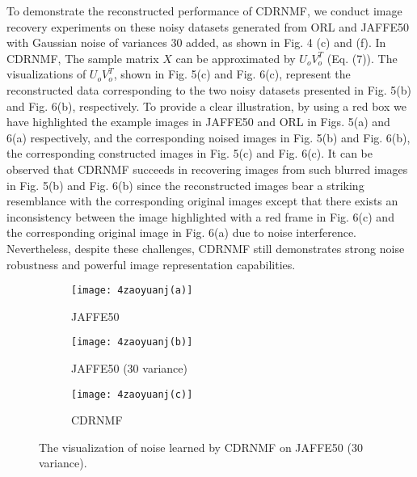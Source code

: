 \documentclass[a4paper,fleqn]{cas-sc}
\begin{document}
To demonstrate the reconstructed performance of CDRNMF, we conduct image recovery experiments on these noisy datasets generated from ORL and JAFFE50 with Gaussian noise of variances 30 added, as shown in Fig. 4 (c) and (f). In CDRNMF, The sample matrix $X$ can be approximated by $U_o V_o^T$ (Eq. (7)). The visualizations of $U_o V_o^T$, shown in Fig. 5(c) and Fig. 6(c), represent the reconstructed data corresponding to the two noisy datasets presented in Fig. 5(b) and Fig. 6(b), respectively. To provide a clear illustration, by using a red box we have highlighted the example images in JAFFE50 and ORL in Figs. 5(a) and 6(a) respectively, and the corresponding noised images in Fig. 5(b) and Fig. 6(b), the corresponding constructed images in Fig. 5(c) and Fig. 6(c). It can be observed that CDRNMF succeeds in recovering images from such blurred images in Fig. 5(b) and Fig. 6(b) since the reconstructed images bear a striking resemblance with the corresponding original images except that there exists an inconsistency between the image highlighted with a red frame in Fig. 6(c) and the corresponding original image in Fig. 6(a) due to noise interference. Nevertheless, despite these challenges, CDRNMF still demonstrates strong noise robustness and powerful image representation capabilities.
\begin{figure}[!t]
	\centering
	\begin{subfigure}[b]{.23\textwidth}
		\centering
		\texttt{[image: 4zaoyuanj(a)]}
		\caption{JAFFE50}\label{subfig:4zaoyuanj(a)}
	\end{subfigure}
	\begin{subfigure}[b]{.23\textwidth}
		\centering
		\texttt{[image: 4zaoyuanj(b)]}
		\caption{JAFFE50 (30 variance)}\label{subfig:4zaoyuanj(b)}
	\end{subfigure}
	\begin{subfigure}[b]{.23\textwidth}
		\centering
		\texttt{[image: 4zaoyuanj(c)]}
		\caption{CDRNMF}\label{subfig:4zaoyuanj(c)}
	\end{subfigure}
	
	\caption{The visualization of noise learned by CDRNMF on JAFFE50 (30 variance).}\label{fig:4zaoyuanj}
\end{figure}
\end{document}
